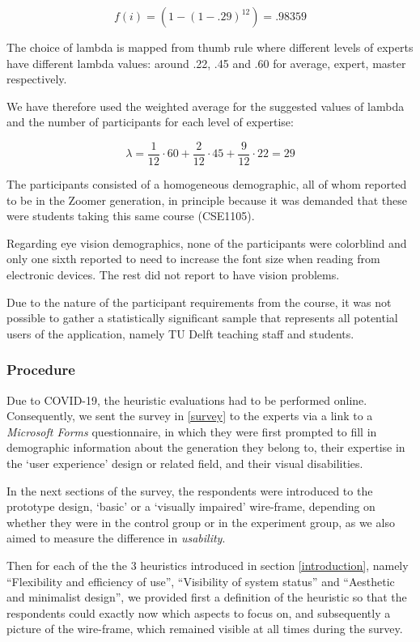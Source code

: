 \documentclass{article}
\begin{document}
$$f(i) = (1-(1-.29)^{12})=.98359$$

The choice of lambda is mapped from \textcite{Nielsen1994} thumb rule where different levels of experts have different lambda
values: around .22, .45 and .60 for average, expert, master respectively.

We have therefore used the weighted average for the suggested values of lambda and the number of participants for each level of expertise:

$$\lambda = \frac{1}{12} \cdot 60 + \frac{2}{12} \cdot 45 + \frac{9}{12} \cdot 22 = 29$$

The participants consisted of a homogeneous demographic, all of whom reported to be in the Zoomer generation, in principle because it was demanded
that these were students taking this same course (CSE1105).

Regarding eye vision demographics, none of the participants were colorblind and only one sixth reported to need to increase the font size
when reading from electronic devices. The rest did not report to have vision problems.

Due to the nature of the participant requirements from the course, it was not possible to gather a statistically significant sample that represents all potential users of the application, namely TU Delft teaching staff and students.

\subsubsection{Procedure\label{procedure}}

Due to COVID-19, the heuristic evaluations had to be performed online. Consequently, we sent the survey in \ref{survey} to the experts
via a link to a \emph{Microsoft Forms} questionnaire, in which they were first prompted to fill in demographic information about
the generation they belong to, their expertise in the `user experience' design or related field, and their visual disabilities.

In the next sections of the survey, the respondents were introduced to the prototype design,
`basic' or a `visually impaired' wire-frame, depending on whether they were in the control group or in the experiment group,
as we also aimed to measure the difference in \emph{usability}.

Then for each of the the 3 heuristics introduced in section \ref{introduction}, namely ``Flexibility and efficiency of use'', ``Visibility of system status'' and
``Aesthetic and minimalist design'', we provided first a definition of the heuristic so that the respondents could exactly
now which aspects to focus on, and subsequently a picture of the wire-frame, which remained visible at all times during the survey.
\end{document}
